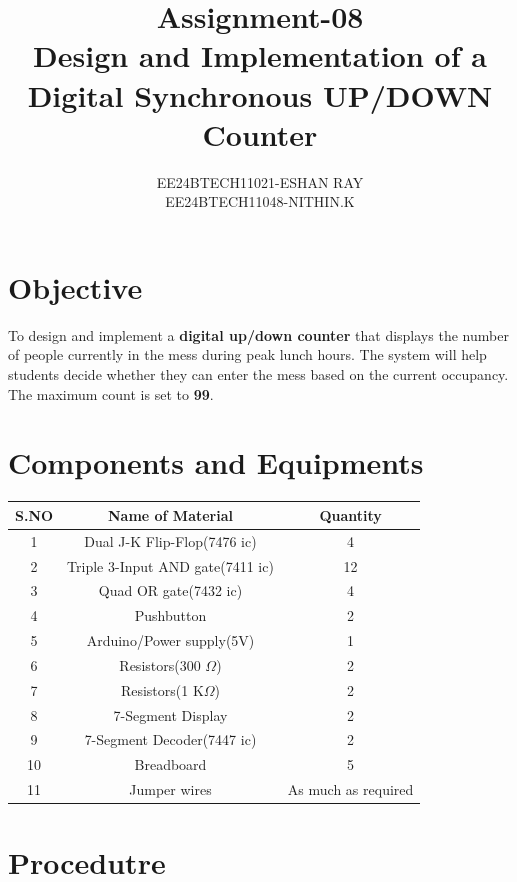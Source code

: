 \documentclass[a4paper,12pt]{article}
\title{\textbf{Assignment-08\\Design and Implementation of a Digital Synchronous UP/DOWN Counter}}
\author{EE24BTECH11021-ESHAN RAY\\ EE24BTECH11048-NITHIN.K}
\begin{document}
\maketitle

\section{Objective}
To design and implement a \textbf{digital up/down counter} that displays the number of people currently in the mess during peak lunch hours. The system will help students decide whether they can enter the mess based on the current occupancy. The maximum count is set to \textbf{99}.

\section{Components and Equipments}
\begin{table}[H]
	\centering
	\begin{tabular}{|c|c|c|}
		\hline
		\textbf{S.NO} & \textbf{Name of Material} & \textbf{Quantity} \\
		\hline
		1 & Dual J-K Flip-Flop(7476 ic) & 4 \\
		\hline
		2 & Triple 3-Input AND gate(7411 ic) & 12 \\
		\hline
		3 & Quad OR gate(7432 ic) & 4 \\
		\hline
		4 & Pushbutton & 2 \\
		\hline
		5 & Arduino/Power supply(5V) & 1 \\
		\hline
		6 & Resistors(300 $\Omega$) & 2 \\
		\hline
		7 & Resistors(1 K$\Omega$) & 2 \\
		\hline
		8 & 7-Segment Display & 2 \\
		\hline
		9 & 7-Segment Decoder(7447 ic) & 2 \\
		\hline
		10 & Breadboard & 5 \\
		\hline
		11 & Jumper wires & As much as required \\
		\hline
	\end{tabular}
\end{table}
\section{Procedutre}
\end{document}
